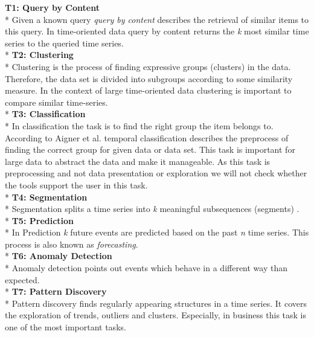 \textbf{T1: Query by Content}
\\*
Given a known query \textit{query by content} describes the retrieval of similar items to this query. In time-oriented data query by content returns the \textit{k} most similar time series to the queried time series.
\\*
\textbf{T2: Clustering}\\*
Clustering is the process of finding expressive groups (clusters) in the data. Therefore, the data set is divided into subgroups according to some similarity measure. In the context of large time-oriented data clustering is important to compare similar time-series.
\\*
\textbf{T3: Classification}\\*
In classification the task is to find the right group the item belongs to. According to Aigner et al. temporal classification describes the preprocess of finding the correct group for given data or data set. This task is important for large data to abstract the data and make it manageable. As this task is preprocessing and not data presentation or exploration we will not check whether the tools support the user in this task. 
\\*
\textbf{T4: Segmentation}\\*
Segmentation splits a time series into \textit{k} meaningful subsequences (segments)  \cite{Batyrshin2007}. 
\\*
\textbf{T5: Prediction}\\*
In Prediction \textit{k} future events are predicted based on the past \textit{n} time series. This process is also known as \textit{forecasting}. 
\\*
\textbf{T6: Anomaly Detection} \\*
Anomaly detection points out events which behave in a different way than expected.
\\*
\textbf{T7: Pattern Discovery}\\*
Pattern discovery finds regularly appearing structures in a time series.  It covers the exploration of trends, outliers and clusters. Especially, in business this task is one of the most important tasks.

